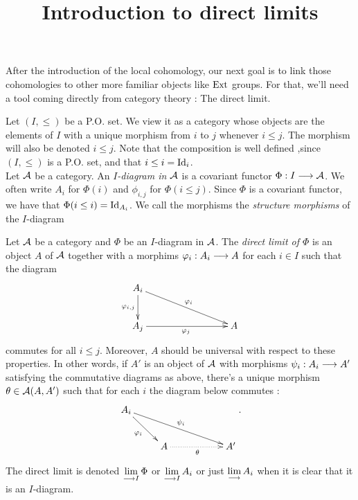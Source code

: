 \documentclass[11pt, a4paper, twoside]{article}
\begin{document}
\title{Introduction to direct limits}
\maketitle

After the introduction of the local cohomology, our next goal is to link those cohomologies to other more familiar objects like $\operatorname{Ext}$ groups. 
For that, we'll need a tool coming directly  from category theory : The direct limit.

\begin{defin}
Let $(I,\leq)$ be a P.O. set. We view it as a category whose objects are the elements of $I$ with a unique morphism from $i$ to $j$ whenever $i\leq j$. The morphism will also be denoted $i\leq j$. Note that the composition is well defined ,since $(I,\leq)$ is a P.O. set, and that $i\leq i=\mathrm{Id}_i$.\\
Let $\mathcal{A}$ be a category. An \emph{$I$-diagram in $\mathcal{A}$} is a covariant functor $\Phi:I\longrightarrow\mathcal{A}$. We often write $A_i$ for $\Phi(i)$ and $\phi_{i,j}$ for $\Phi(i\leq j)$. Since $\Phi$ is a covariant functor, we have that $\Phi(i\leq i)=\mathrm{Id}_{A_i}$. We call the morphisms the \emph{structure morphisms} of the $I$-diagram
\end{defin}
\begin{defin}
Let $\mathcal{A}$ be a category and $\Phi$ be an $I$-diagram in $\mathcal{A}$. The \emph{direct limit of $\Phi$} is an object $A$ of $\mathcal{A}$ together with a morphims $\varphi_i:A_i\longrightarrow A$ for each $i\in I$ such that the diagram
\begin{displaymath}
    \xymatrix{
    A_i\ar[d]_{\phi_{i,j}}\ar[rrrd]^{\phi_i}\\
    A_j\ar[rrr]_{\phi_j} & & &  A\\
   }
\end{displaymath}
commutes for all $i\leq j$. Moreover, $A$ should be universal with respect to these properties. In other words, if $A'$ is an object of $\mathcal{A}$ with morphisms $\psi_i:A_i\longrightarrow A'$ satisfying the commutative diagrams as above, there's a unique morphism $\theta\in\mathcal{A}(A,A')$ such that for each $i$ the diagram below commutes :
\begin{displaymath}
    \xymatrix{
    A_i\ar[dr]_{\phi_i}\ar[drrr]^{\psi_i}\\
    & A\ar@{.>}[rr]_{\theta}  & & A'
    }.
\end{displaymath}
The direct limit is denoted $\lim\limits_{\longrightarrow I}\Phi$ or $\lim\limits_{\longrightarrow I}A_i$ or just $\lim\limits_{\longrightarrow}A_i$ when it is clear that it is an $I$-diagram.
\end{defin}
\end{document}
